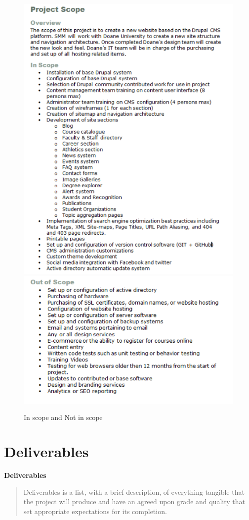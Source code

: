 \documentclass{article}
\begin{document}
\begin{figure}[H]
	\centering
	\includegraphics[scale=0.3]{Scope1.png}
	\includegraphics[scale=0.3]{!Scope1.png}
	\caption{In scope and Not in scope}
\end{figure}

\newpage
\section{Deliverables}
\textbf{Deliverables}
\begin{quote}
Deliverables is a list, with a brief description, of everything tangible that the project will produce and have an agreed upon grade and quality that set appropriate expectations for its completion.
\end{quote}
\end{document}
